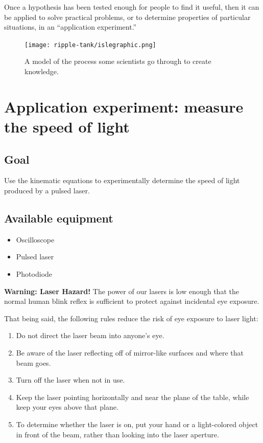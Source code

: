 Once a hypothesis has been tested enough for people to find it useful, then it can be applied to solve practical problems, or to determine properties of particular situations, in an ``application experiment.''

\begin{figure}
	\centering
	\texttt{[image: ripple-tank/islegraphic.png]}
	\caption{A model of the process some scientists go through to create knowledge.\label{me:fig:isle}}
\end{figure}

\section{Application experiment: measure the speed of light}

\subsection{Goal}

Use the kinematic equations to experimentally determine the speed of light produced by a pulsed laser.

\subsection{Available equipment}

\begin{itemize}
	\item Oscilloscope
	\item Pulsed laser
	\item Photodiode
\end{itemize}

\begin{framed}
	\textbf{Warning: Laser Hazard!} The power of our lasers is low enough that the normal human blink reflex is sufficient to protect against incidental eye exposure.
	
	That being said, the following rules reduce the risk of eye exposure to laser light:
	\begin{enumerate}
		\item Do not direct the laser beam into anyone's eye.
		\item Be aware of the laser reflecting off of mirror-like surfaces and where that beam goes.
		\item Turn off the laser when not in use.
		\item Keep the laser pointing horizontally and near the plane of the table, while keep your eyes above that plane.
		\item To determine whether the laser is on, put your hand or a light-colored object in front of the beam, rather than looking into the laser aperture.
	\end{enumerate}
\end{framed}

